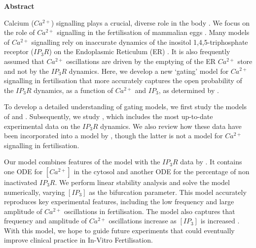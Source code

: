 \thispagestyle{plain}
    \LARGE
    \textbf{Abstract}
    
    \vspace{2cm}
    \normalsize
    Calcium ($Ca^{2+}$) signalling plays a crucial, diverse role in the body . We focus on the role of $Ca^{2+}$ signalling in the fertilisation of mammalian eggs .
    Many models of $Ca^{2+}$ signalling {rely on inaccurate dynamics of the inositol 1,4,5-triphosphate receptor ($IP_3R$)} on the Endoplasmic Reticulum (ER) . It is also frequently assumed that $Ca^{2+}$ oscillations are driven by the emptying of the ER $Ca^{2+}$ store and not by the $IP_3R$ dynamics. Here, we develop a new `gating' model for $Ca^{2+}$ signalling in fertilisation that {more accurately captures the open probability of the $IP_3R$ dynamics, as a function of $Ca^{2+}$ and $IP_3$,} as determined by .
    
    To develop a detailed understanding of gating models, we first study the models of  and . Subsequently, we study , which includes the most up-to-date experimental data on the $IP_3R$ dynamics. We also review how these data have been incorporated into a model by , though the latter is not a model for $Ca^{2+}$ signalling in fertilisation.
    
 Our model combines features of the  model with the $IP_3R$ data by . It contains one ODE for $[Ca^{2+}]$ in the cytosol and another ODE for the percentage of non inactivated $IP_3R$. We perform linear stability analysis and solve the model numerically, varying $[IP_3]$ as the bifurcation parameter. This model accurately reproduces key experimental features, including the low frequency and large amplitude of $Ca^{2+}$ oscillations in fertilisation. The model also captures that frequency and amplitude of $Ca^{2+}$ oscillations increase as $[IP_3]$ is increased .
 With this model, we hope to guide future experiments that could eventually improve  clinical practice in In-Vitro Fertilisation. 
